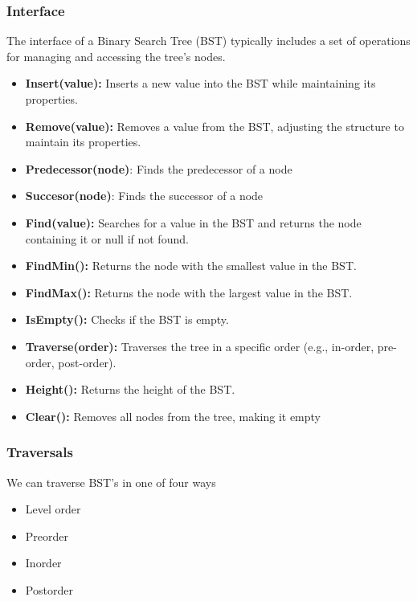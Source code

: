 \documentclass{report}
\begin{document}
\subsubsection{Interface}
\bigbreak \noindent 
The interface of a Binary Search Tree (BST) typically includes a set of operations for managing and accessing the tree’s nodes.
\begin{itemize}
    \item \textbf{Insert(value):} Inserts a new value into the BST while maintaining its properties.
    \item \textbf{Remove(value):} Removes a value from the BST, adjusting the structure to maintain its properties.
    \item \textbf{Predecessor(node)}: Finds the predecessor of a node
    \item \textbf{Succesor(node)}: Finds the successor of a node
    \item \textbf{Find(value):} Searches for a value in the BST and returns the node containing it or null if not found.
    \item \textbf{FindMin():} Returns the node with the smallest value in the BST.
    \item \textbf{FindMax():} Returns the node with the largest value in the BST.
    \item \textbf{IsEmpty():} Checks if the BST is empty.
    \item \textbf{Traverse(order):} Traverses the tree in a specific order (e.g., in-order, pre-order, post-order).
    \item \textbf{Height():} Returns the height of the BST.
    \item \textbf{Clear():} Removes all nodes from the tree, making it empty
\end{itemize}

\pagebreak 
\subsubsection{Traversals}
\bigbreak \noindent 
We can traverse BST's in one of four ways
\begin{itemize}
    \item Level order
    \item Preorder
    \item Inorder
    \item Postorder
\end{itemize}
\bigbreak \noindent 
\end{document}
